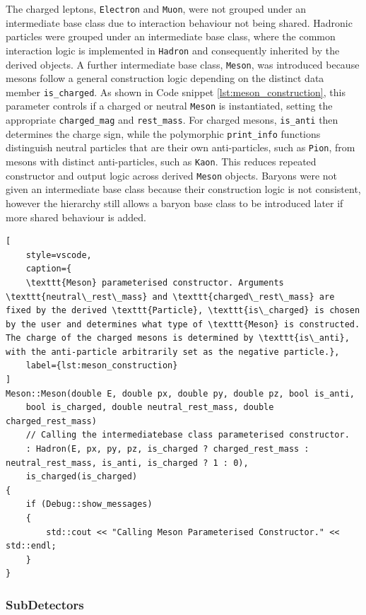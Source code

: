 \documentclass{article}
\begin{document}
The charged leptons, \texttt{Electron} and \texttt{Muon}, were not grouped under an intermediate base class due to interaction behaviour not being shared.
Hadronic particles were grouped under an intermediate base class, where the common interaction logic is implemented in \texttt{Hadron} and consequently inherited by the derived objects.
A further intermediate base class, \texttt{Meson}, was introduced because mesons follow a general construction logic depending on the distinct data member \texttt{is\_charged}.
As shown in Code snippet \ref{lst:meson_construction}, this parameter controls if a charged or neutral \texttt{Meson} is instantiated, setting the appropriate \texttt{charged\_mag} and \texttt{rest\_mass}.
For charged mesons, \texttt{is\_anti} then determines the charge sign, while the polymorphic \texttt{print\_info} functions distinguish neutral particles that are their own anti-particles, such as \texttt{Pion}, from mesons with distinct anti-particles, such as \texttt{Kaon}.
This reduces repeated constructor and output  logic across derived \texttt{Meson} objects.
Baryons were not given an intermediate base class because their construction logic is not consistent, however the hierarchy still allows a baryon base class to be introduced later if more shared behaviour is added.
\begin{lstlisting}[
    style=vscode, 
    caption={
    \texttt{Meson} parameterised constructor. Arguments \texttt{neutral\_rest\_mass} and \texttt{charged\_rest\_mass} are fixed by the derived \texttt{Particle}, \texttt{is\_charged} is chosen by the user and determines what type of \texttt{Meson} is constructed. The charge of the charged mesons is determined by \texttt{is\_anti}, with the anti-particle arbitrarily set as the negative particle.},
    label={lst:meson_construction}
]
Meson::Meson(double E, double px, double py, double pz, bool is_anti,
    bool is_charged, double neutral_rest_mass, double charged_rest_mass)
    // Calling the intermediatebase class parameterised constructor.
    : Hadron(E, px, py, pz, is_charged ? charged_rest_mass : neutral_rest_mass, is_anti, is_charged ? 1 : 0),
    is_charged(is_charged)
{
    if (Debug::show_messages)
    {
        std::cout << "Calling Meson Parameterised Constructor." << std::endl;
    }
}
\end{lstlisting}

\subsubsection{SubDetectors}
\label{sec:min_func_SubDetectors}
\end{document}
